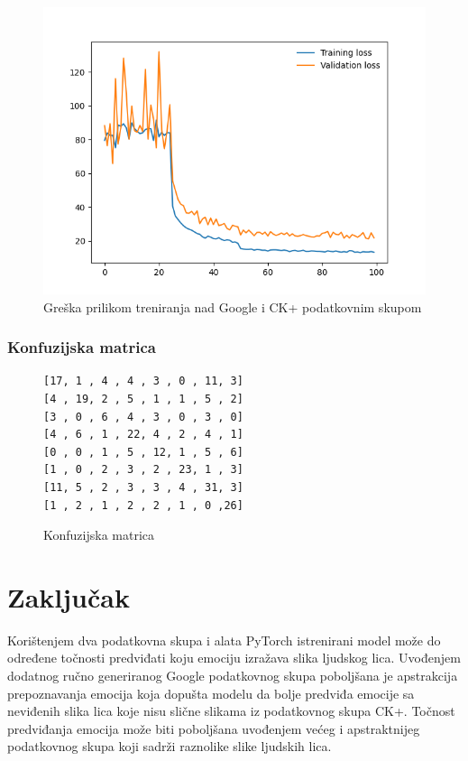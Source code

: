 \documentclass[times, utf8, zavrsni,numeric,pstricks]{fer}
\begin{document}
\begin{figure}[H]
	\centering
	\includegraphics[width=\linewidth, height=0.3\paperheight, keepaspectratio]{val_go_ck.png}
	\caption{Greška prilikom treniranja nad Google i CK+ podatkovnim skupom}
	\label{loss_duo}
\end{figure}


\subsection{Konfuzijska matrica}


\begin{figure}[H]
\centering

\begin{Verbatim}[fontsize=\small]
[17, 1 , 4 , 4 , 3 , 0 , 11, 3]
[4 , 19, 2 , 5 , 1 , 1 , 5 , 2]
[3 , 0 , 6 , 4 , 3 , 0 , 3 , 0]
[4 , 6 , 1 , 22, 4 , 2 , 4 , 1]
[0 , 0 , 1 , 5 , 12, 1 , 5 , 6]
[1 , 0 , 2 , 3 , 2 , 23, 1 , 3]
[11, 5 , 2 , 3 , 3 , 4 , 31, 3]
[1 , 2 , 1 , 2 , 2 , 1 , 0 ,26]
\end{Verbatim}
\caption{Konfuzijska matrica}
\label{pic:init_resnet}
\end{figure}



\chapter{Zaključak}
Korištenjem dva podatkovna skupa i alata PyTorch istrenirani model može do određene točnosti predviđati koju emociju izražava slika ljudskog lica. Uvođenjem dodatnog ručno generiranog Google podatkovnog skupa poboljšana je apstrakcija prepoznavanja emocija koja dopušta modelu da bolje predviđa emocije sa neviđenih slika lica koje nisu slične slikama iz podatkovnog skupa CK+. Točnost predviđanja emocija može biti poboljšana uvođenjem većeg i apstraktnijeg podatkovnog skupa koji sadrži raznolike slike ljudskih lica. 
\end{document}
